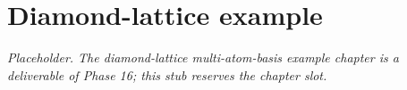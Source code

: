 \chapter{Diamond-lattice example}
\label{chap:diamond-lattice}

\textit{Placeholder. The diamond-lattice multi-atom-basis example
chapter is a deliverable of Phase 16; this stub reserves the chapter
slot.}
